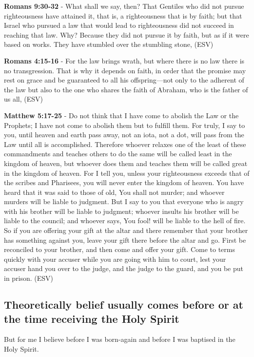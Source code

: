 \documentclass[11pt]{article}
\begin{document}
\textbf{Romans 9:30-32} - What shall we say, then? That Gentiles who did not pursue righteousness have attained it, that is, a righteousness that is by faith; but that Israel who pursued a law that would lead to righteousness did not succeed in reaching that law. Why? Because they did not pursue it by faith, but as if it were based on works. They have stumbled over the stumbling stone, (ESV)

\textbf{Romans 4:15-16} - For the law brings wrath, but where there is no law there is no transgression. That is why it depends on faith, in order that the promise may rest on grace and be guaranteed to all his offspring—not only to the adherent of the law but also to the one who shares the faith of Abraham, who is the father of us all, (ESV)

\textbf{Matthew 5:17-25} - Do not think that I have come to abolish the Law or the Prophets; I have not come to abolish them but to fulfill them. For truly, I say to you, until heaven and earth pass away, not an iota, not a dot, will pass from the Law until all is accomplished. Therefore whoever relaxes one of the least of these commandments and teaches others to do the same will be called least in the kingdom of heaven, but whoever does them and teaches them will be called great in the kingdom of heaven. For I tell you, unless your righteousness exceeds that of the scribes and Pharisees, you will never enter the kingdom of heaven. You have heard that it was said to those of old, You shall not murder; and whoever murders will be liable to judgment. But I say to you that everyone who is angry with his brother will be liable to judgment; whoever insults his brother will be liable to the council; and whoever says, You fool! will be liable to the hell of fire. So if you are offering your gift at the altar and there remember that your brother has something against you, leave your gift there before the altar and go. First be reconciled to your brother, and then come and offer your gift. Come to terms quickly with your accuser while you are going with him to court, lest your accuser hand you over to the judge, and the judge to the guard, and you be put in prison. (ESV)

\subsection{Theoretically belief usually comes before or at the time receiving the Holy Spirit}
\label{sec:orgc302b71}
But for me I believe before I was born-again and before I was baptised in the Holy Spirit.
\end{document}
